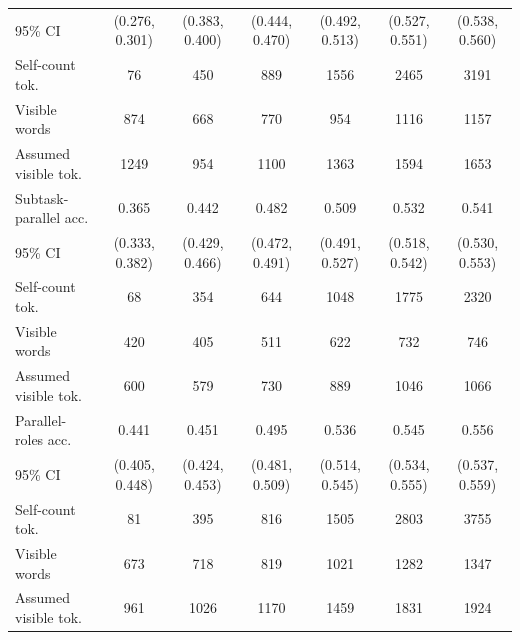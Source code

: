 \documentclass{article} %
\begin{document}
\begin{table}[t]
{\begin{tabular}{lcccccc}
95\% CI & (0.276, 0.301) & (0.383, 0.400) & (0.444, 0.470) & (0.492, 0.513) & (0.527, 0.551) & (0.538, 0.560) \\
Self-count tok. & 76 & 450 & 889 & 1556 & 2465 & 3191 \\
Visible words & 874 & 668 & 770 & 954 & 1116 & 1157 \\
Assumed visible tok. & 1249 & 954 & 1100 & 1363 & 1594 & 1653 \\
\midrule
Subtask-parallel acc. & 0.365 & 0.442 & 0.482 & 0.509 & 0.532 & 0.541 \\
95\% CI & (0.333, 0.382) & (0.429, 0.466) & (0.472, 0.491) & (0.491, 0.527) & (0.518, 0.542) & (0.530, 0.553) \\
Self-count tok. & 68 & 354 & 644 & 1048 & 1775 & 2320 \\
Visible words & 420 & 405 & 511 & 622 & 732 & 746 \\
Assumed visible tok. & 600 & 579 & 730 & 889 & 1046 & 1066 \\
\midrule
Parallel-roles acc. & 0.441 & 0.451 & 0.495 & 0.536 & 0.545 & 0.556 \\
95\% CI & (0.405, 0.448) & (0.424, 0.453) & (0.481, 0.509) & (0.514, 0.545) & (0.534, 0.555) & (0.537, 0.559) \\
Self-count tok. & 81 & 395 & 816 & 1505 & 2803 & 3755 \\
Visible words & 673 & 718 & 819 & 1021 & 1282 & 1347 \\
Assumed visible tok. & 961 & 1026 & 1170 & 1459 & 1831 & 1924 \\
\bottomrule
\end{tabular}}
\end{table}
\end{document}
